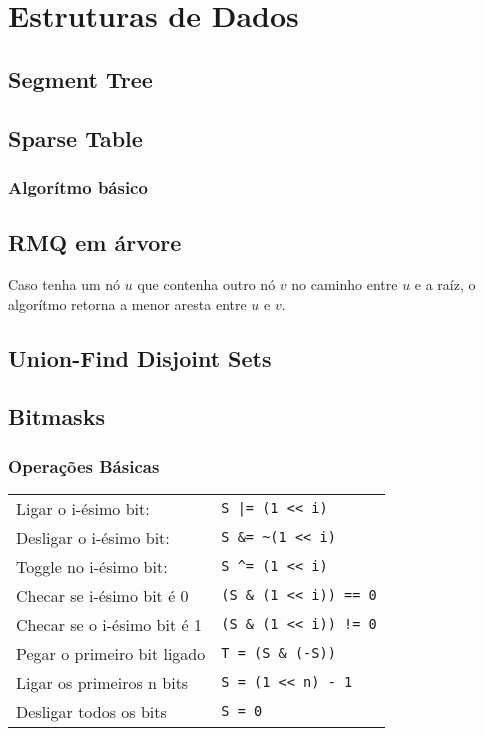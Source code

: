 \section{Estruturas de Dados}

\subsection{Segment Tree}
\divisor

\subsection{Sparse Table}
\subsubsection{Algor\'{i}tmo b\'{a}sico}
\divisor

\subsection{RMQ em \'{a}rvore}
Caso tenha um n\'{o} $u$ que contenha outro n\'{o} $v$ no caminho entre $u$ e a ra\'{i}z, o algor\'{i}tmo retorna a menor aresta entre $u$ e $v$.
\divisor

\subsection{Union-Find Disjoint Sets}
\divisor

\subsection{Bitmasks}
\subsubsection{Operações Básicas}
\begin{tabular}{l | l}
		Ligar o i-ésimo bit: 		&   \texttt{S |= (1 << i)} 			\\
		Desligar o i-ésimo bit: 	&	\texttt{S \&= \textasciitilde(1 << i)} 		\\
		Toggle no i-ésimo bit:		&   \texttt{S \textasciicircum= (1 << i)} 			\\
		Checar se i-ésimo bit é 0  	&	\texttt{(S \& (1 << i)) == 0} 	\\
		Checar se o i-ésimo bit é 1 &	\texttt{(S \& (1 << i)) != 0} 	\\
		Pegar o primeiro bit ligado	& 	\texttt{T = (S \& (-S))} 		\\
		Ligar os primeiros n bits	& 	\texttt{S = (1 << n) - 1} 		\\
		Desligar todos os bits		& 	\texttt{S = 0} 
\end{tabular}

